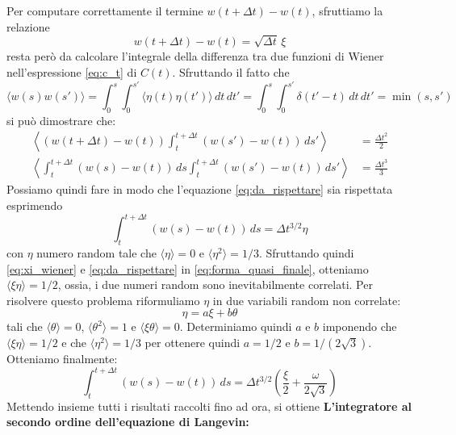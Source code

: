 \documentclass[10pt,a4paper]{article}
\begin{document}
Per computare correttamente il termine \(w(t+\Delta t) - w(t)\), sfruttiamo la relazione
\begin{equation}
	w(t+\Delta t) - w(t) = \sqrt{\Delta t}\,\xi \label{eq:xi_wiener}
\end{equation}
resta però da calcolare l'integrale della differenza tra due funzioni di Wiener nell'espressione \eqref{eq:c_t} di \(C(t)\). Sfruttando il fatto che
\begin{equation}
	\langle w(s)w(s') \rangle = \int_0^s \int_0^{s'} \langle \eta(t)\eta(t') \rangle\,dt\,dt' = \int_0^s \int_0^{s'} \delta(t'-t) \,dt\,dt' = \min(s,s')
\end{equation}
si può dimostrare che:
\begin{align}
	\left\langle (w(t+\Delta t)-w(t))\int_t^{t+\Delta t} (w(s')-w(t))\,ds' \right\rangle &= \frac{\Delta t^2}{2} \label{eq:cosaaaaaa}\\
	\left\langle \int_t^{t+\Delta t} (w(s)-w(t))\,ds \int_t^{t+\Delta t} (w(s')-w(t))\,ds' \right\rangle &= \frac{\Delta t^3}{3} \label{eq:da_rispettare}
\end{align}
Possiamo quindi fare in modo che l'equazione \eqref{eq:da_rispettare} sia rispettata esprimendo
\begin{equation}
	\int_t^{t+\Delta t} (w(s) - w(t))\,ds = \Delta t^{3/2}\eta
	\label{eq:forma_quasi_finale}
\end{equation}
con \(\eta\) numero random tale che \(\langle\eta\rangle = 0\) e \(\langle\eta^2\rangle = 1/3\). Sfruttando quindi \eqref{eq:xi_wiener} e \eqref{eq:da_rispettare} in \eqref{eq:forma_quasi_finale}, otteniamo \(\langle \xi \eta \rangle = 1/2\), ossia, i due numeri random sono inevitabilmente correlati. Per risolvere questo problema riformuliamo \(\eta\) in due variabili random non correlate:
\begin{equation}
	\eta = a \xi + b \theta
\end{equation}
tali che \(\langle\theta\rangle = 0\), \(\langle\theta^2\rangle = 1\) e \(\langle\xi\theta\rangle = 0\). Determiniamo quindi \(a\) e \(b\) imponendo che \(\langle \xi \eta\rangle = 1/2\) e che \(\langle\eta^2\rangle = 1/3\) per ottenere quindi \(a = 1/2\) e \(b = 1/(2\sqrt{3})\). Otteniamo finalmente:
\begin{equation}
	\int_t^{t+\Delta t} (w(s) - w(t))\,ds = \Delta t^{3/2} \left( \frac{\xi}{2} + \frac{\omega}{2\sqrt{3}} \right)
\end{equation}
Mettendo insieme tutti i risultati raccolti fino ad ora, si ottiene \textbf{L'integratore al secondo ordine dell'equazione di Langevin:}
\end{document}
